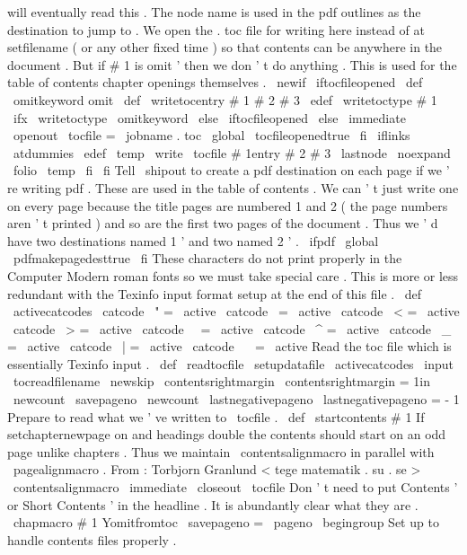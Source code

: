 {{{{will
eventually
%
read
this
.
The
node
name
is
used
in
the
pdf
outlines
as
the
%
destination
to
jump
to
.
%
%
We
open
the
.
toc
file
for
writing
here
instead
of
at
setfilename
(
or
%
any
other
fixed
time
)
so
that
contents
can
be
anywhere
in
the
document
.
%
But
if
#
1
is
omit
'
then
we
don
'
t
do
anything
.
This
is
used
for
the
%
table
of
contents
chapter
openings
themselves
.
%
\
newif
\
iftocfileopened
\
def
\
omitkeyword
{
omit
}
%
%
\
def
\
writetocentry
#
1
#
2
#
3
{
%
\
edef
\
writetoctype
{
#
1
}
%
\
ifx
\
writetoctype
\
omitkeyword
\
else
\
iftocfileopened
\
else
\
immediate
\
openout
\
tocfile
=
\
jobname
.
toc
\
global
\
tocfileopenedtrue
\
fi
%
\
iflinks
{
\
atdummies
\
edef
\
temp
{
%
\
write
\
tocfile
{
#
1entry
{
#
2
}
{
#
3
}
{
\
lastnode
}
{
\
noexpand
\
folio
}
}
}
%
\
temp
}
%
\
fi
\
fi
%
%
Tell
\
shipout
to
create
a
pdf
destination
on
each
page
if
we
'
re
%
writing
pdf
.
These
are
used
in
the
table
of
contents
.
We
can
'
t
%
just
write
one
on
every
page
because
the
title
pages
are
numbered
%
1
and
2
(
the
page
numbers
aren
'
t
printed
)
and
so
are
the
first
%
two
pages
of
the
document
.
Thus
we
'
d
have
two
destinations
named
%
1
'
and
two
named
2
'
.
\
ifpdf
\
global
\
pdfmakepagedesttrue
\
fi
}
%
These
characters
do
not
print
properly
in
the
Computer
Modern
roman
%
fonts
so
we
must
take
special
care
.
This
is
more
or
less
redundant
%
with
the
Texinfo
input
format
setup
at
the
end
of
this
file
.
%
\
def
\
activecatcodes
{
%
\
catcode
\
"
=
\
active
\
catcode
\
=
\
active
\
catcode
\
<
=
\
active
\
catcode
\
>
=
\
active
\
catcode
\
\
=
\
active
\
catcode
\
^
=
\
active
\
catcode
\
_
=
\
active
\
catcode
\
|
=
\
active
\
catcode
\
~
=
\
active
}
%
Read
the
toc
file
which
is
essentially
Texinfo
input
.
\
def
\
readtocfile
{
%
\
setupdatafile
\
activecatcodes
\
input
\
tocreadfilename
}
\
newskip
\
contentsrightmargin
\
contentsrightmargin
=
1in
\
newcount
\
savepageno
\
newcount
\
lastnegativepageno
\
lastnegativepageno
=
-
1
%
Prepare
to
read
what
we
'
ve
written
to
\
tocfile
.
%
\
def
\
startcontents
#
1
{
%
%
If
setchapternewpage
on
and
headings
double
the
contents
should
%
start
on
an
odd
page
unlike
chapters
.
Thus
we
maintain
%
\
contentsalignmacro
in
parallel
with
\
pagealignmacro
.
%
From
:
Torbjorn
Granlund
<
tege
matematik
.
su
.
se
>
\
contentsalignmacro
\
immediate
\
closeout
\
tocfile
%
%
Don
'
t
need
to
put
Contents
'
or
Short
Contents
'
in
the
headline
.
%
It
is
abundantly
clear
what
they
are
.
\
chapmacro
{
#
1
}
{
Yomitfromtoc
}
{
}
%
%
\
savepageno
=
\
pageno
\
begingroup
%
Set
up
to
handle
contents
files
properly
.
\
}}}}}
